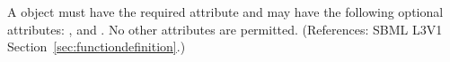A \FunctionDefinition object must have the required attribute 
 and may have the following optional attributes:
,  and .  No other attributes are permitted.  
(References: SBML L3V1 Section~\ref{sec:functiondefinition}.)
